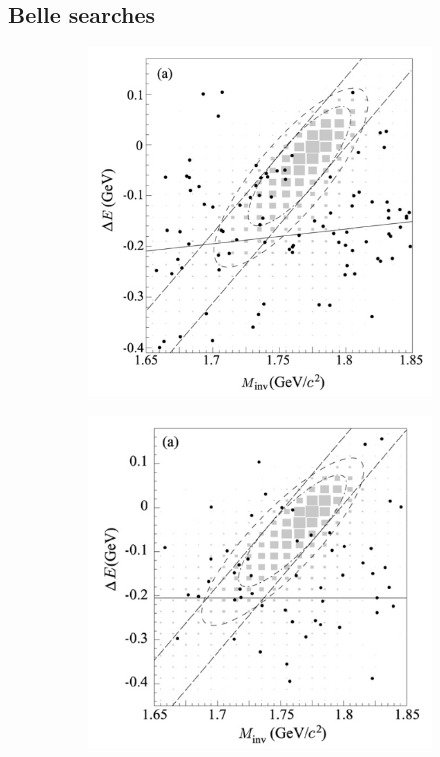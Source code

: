 \documentclass[12pt]{thesis}  %
\begin{document}
\subsection{Belle searches}


   \begin{figure}[h]
        \centering
        \begin{subfigure}[b]{0.475\textwidth}
            \centering
            \includegraphics[width=\textwidth]{images/belle-search-tauMG-signal-region.png}
            \caption[]%
            {{\small}}    
            \label{fig:Belle search tauMG signal region}
        \end{subfigure}
        \hfill
        \begin{subfigure}[b]{0.475\textwidth}  
            \centering 
            \includegraphics[width=\textwidth]{images/belle-search-tauEG-signal-region.png}

\end{subfigure}
\end{figure}
\end{document}
